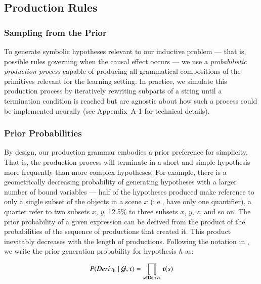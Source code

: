 \documentclass[doc,natbib,floatsintext]{apa7}
\begin{document}
\subsection{Production Rules}

\subsubsection{Sampling from the Prior}
To generate symbolic hypotheses relevant to our inductive problem --- that is, possible rules governing when the causal effect occurs --- we use a \emph{probabilistic production process} capable of producing all grammatical compositions of the primitives relevant for the learning setting. In practice, we simulate this production process by iteratively rewriting subparts of a string until a termination condition is reached \citep{manning1999foundations, goodman2008rational,piantadosi2016logical,bramley2018grounding} but are agnostic about how such a process could be implemented neurally (see Appendix~A-1 for technical details).


\subsubsection{Prior Probabilities}
By design, our production grammar embodies a prior preference for simplicity. That is, the production process will terminate in a short and simple hypothesis more frequently than more complex hypotheses. For example, there is a geometrically decreasing probability of generating hypotheses with a larger number of bound variables --- half of the hypotheses produced make reference to only a single subset of the objects in a scene $x$ (i.e., have only one quantifier), a quarter refer to two subsets $x$, $y$, 12.5\% to three subsets $x$, $y$, $z$, and so on. The prior probability of a given expression can be derived from the product of the probabilities of the sequence of productions that created it. This product inevitably decreases with the length of productions. Following the notation in \cite{goodman2008rational}, we write the prior generation probability for hypothesis \(h\) as:

\begin{equation}
    P(Deriv\textsubscript{h}\mid\mathcal{G},\tau) = \prod_{s\in \text{Deriv}_{h}} \tau(s)
\label{equ:equ_2_prior}
\end{equation} 
\end{document}
